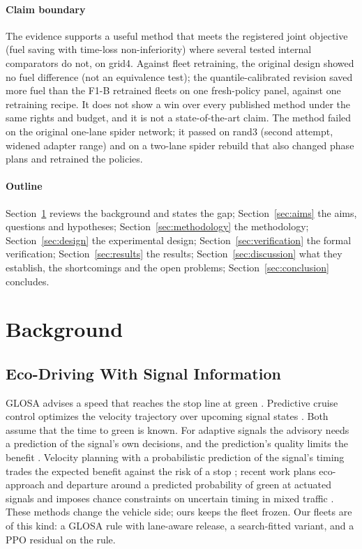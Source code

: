 \paragraph{Claim boundary} The evidence supports a useful method that meets the registered joint objective (fuel saving with
time-loss non-inferiority) where several tested internal comparators do not, on grid4. Against fleet retraining, the original design
showed no fuel difference (not an equivalence test); the quantile-calibrated revision saved more fuel than the F1-B retrained fleets on one
fresh-policy panel, against one retraining recipe. It does not show a win over every
published method under the same rights and budget, and it is not a state-of-the-art claim. The method failed on the original one-lane
spider network; it passed on rand3 (second attempt, widened adapter range) and on a two-lane spider rebuild that also changed phase plans
and retrained the policies.

\paragraph{Outline} Section~\ref{sec:background} reviews the background and states the gap; Section~\ref{sec:aims} the aims,
questions and hypotheses; Section~\ref{sec:methodology} the methodology; Section~\ref{sec:design} the experimental design;
Section~\ref{sec:verification} the formal verification; Section~\ref{sec:results} the results; Section~\ref{sec:discussion} what they
establish, the shortcomings and the open problems; Section~\ref{sec:conclusion} concludes.

\section{Background}\label{sec:background}
\subsection{Eco-Driving With Signal Information}
GLOSA advises a speed that reaches the stop line at green \cite{katsaros2011}. Predictive cruise control optimizes the velocity trajectory
over upcoming signal states \cite{asadi2011}. Both assume that the time to green is known. For adaptive signals the advisory needs a
prediction of the signal's own decisions, and the prediction's quality limits the benefit \cite{bodenheimer2014}. Velocity planning with a
probabilistic prediction of the signal's timing trades the expected benefit against the risk of a stop \cite{mahler2014}; recent work
plans eco-approach and departure around a predicted probability of green at actuated signals \cite{li2025ead} and imposes chance
constraints on uncertain timing in mixed traffic \cite{xue2026cc}. These methods change the vehicle side; ours keeps the fleet frozen. Our fleets are of
this kind: a GLOSA rule with lane-aware release, a search-fitted variant, and a PPO residual on the rule.


